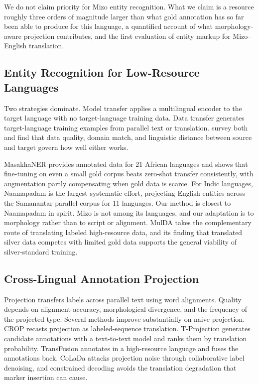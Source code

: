 \documentclass[acmsmall,screen,review]{acmart}
\begin{document}
We do not claim priority for Mizo entity recognition. What we claim is a
resource roughly three orders of magnitude larger than what gold annotation has
so far been able to produce for this language, a quantified account of what
morphology-aware projection contributes, and the first evaluation of entity
markup for Mizo--English translation.

\subsection{Entity Recognition for Low-Resource Languages}
\label{sec:related:lowresource}

Two strategies dominate. Model transfer applies a multilingual encoder to the
target language with no target-language training data. Data transfer generates
target-language training examples from parallel text or translation.
\citet{hedderich2021} survey both and find that data quality, domain match, and
linguistic distance between source and target govern how well either works.

MasakhaNER \citep{adelani2022masakhaner} provides annotated data for 21 African
languages and shows that fine-tuning on even a small gold corpus beats zero-shot
transfer consistently, with augmentation partly compensating when gold data is
scarce. For Indic languages, Naamapadam \citep{mhaske2023naamapadam} is the
largest systematic effort, projecting English entities across the Samanantar
parallel corpus for 11 languages. Our method is closest to Naamapadam in spirit.
Mizo is not among its languages, and our adaptation is to morphology rather than
to script or alignment. MulDA \citep{liu2021mulda} takes the complementary route
of translating labeled high-resource data, and its finding that translated
silver data competes with limited gold data supports the general viability of
silver-standard training.

\subsection{Cross-Lingual Annotation Projection}
\label{sec:related:projection}

Projection transfers labels across parallel text using word alignments. Quality
depends on alignment accuracy, morphological divergence, and the frequency of
the projected type. Several methods improve substantially on naive projection.
CROP \citep{yang2022crop} recasts projection as labeled-sequence translation.
T-Projection \citep{garcia2022tprojection} generates candidate annotations with
a text-to-text model and ranks them by translation probability. TransFusion
\citep{chen2023transfusion} annotates in a high-resource language and fuses the
annotations back. CoLaDa \citep{colada2023} attacks projection noise through
collaborative label denoising, and constrained decoding
\citep{le2024constrained} avoids the translation degradation that marker
insertion can cause.
\end{document}
